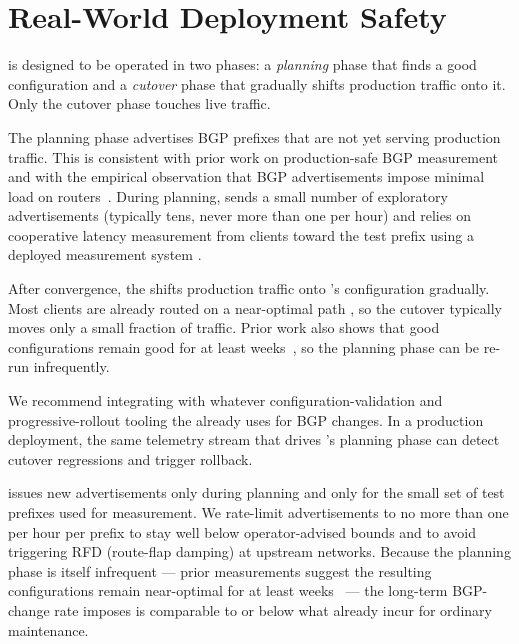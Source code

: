 \documentclass[acmsmall,anonymous,review,nonacm,10pt]{acmart}
\begin{document}
\section{Real-World Deployment Safety}
\label{ap:deployment}

\sparse is designed to be operated in two phases: a
\emph{planning} phase that finds a good configuration and a
\emph{cutover} phase that gradually shifts production traffic
onto it.  Only the cutover phase touches live traffic.

The planning phase advertises BGP prefixes that are not yet
serving production traffic.  This is consistent with prior work on
production-safe BGP measurement
\cite{calder2015analyzing,anyopt,painter} and with the empirical
observation that BGP advertisements impose minimal load on
routers~\cite{sharad-bgp-router-cpu}.  During planning, \sparse
sends a small number of exploratory advertisements (typically
tens, never more than one per hour) and relies on cooperative
latency measurement from clients toward the test prefix using a
deployed measurement system
\cite{odin,end-user-mapping,verfploeter,calder-nel}.

After convergence, the \servprod shifts production traffic onto
\sparse's configuration gradually.  Most clients are already
routed on a near-optimal path
\cite{whyhigh,calder2015analyzing,anyopt,painter}, so the cutover
typically moves only a small fraction of traffic.  Prior work
also shows that good configurations remain good for at least
weeks~\cite{painter}, so the planning phase can be re-run
infrequently.

We recommend integrating \sparse with whatever
configuration-validation and progressive-rollout tooling the
\servprod already uses for BGP changes.  In a production
deployment, the same telemetry stream that drives \sparse's
planning phase can detect cutover regressions and trigger
rollback.

  \sparse issues new
advertisements only during planning and only for the small set of
test prefixes used for measurement.  We rate-limit advertisements
to no more than one per hour per prefix to stay well below
operator-advised bounds and to avoid triggering RFD
(route-flap damping) at upstream networks.  Because the planning
phase is itself infrequent --- prior measurements suggest the
resulting configurations remain near-optimal for at least
weeks~\cite{painter} --- the long-term BGP-change rate \sparse
imposes is comparable to or below what \servprods already incur
for ordinary maintenance.
\end{document}
